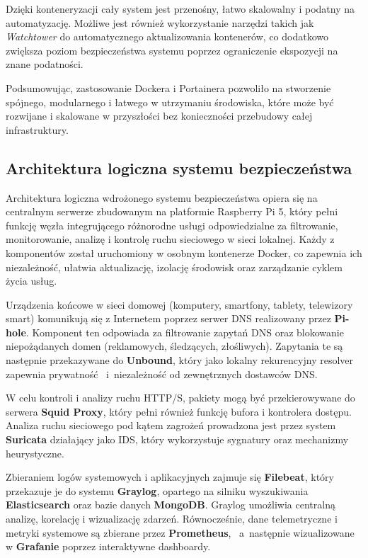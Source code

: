 \documentclass[
    left=2.5cm,         %
    right=2.5cm,        %
    top=2.5cm,          %
    bottom=3cm,         %
    bindingoffset=6mm,  %
    nohyphenation=true %
]{eiti/eiti-thesis} %
\begin{document}
Dzięki konteneryzacji cały system jest przenośny, łatwo skalowalny i podatny na automatyzację. Możliwe jest również wykorzystanie narzędzi takich 
jak \textit{Watchtower} do automatycznego aktualizowania kontenerów, co dodatkowo zwiększa poziom bezpieczeństwa systemu poprzez ograniczenie ekspozycji na znane podatności.

Podsumowując, zastosowanie Dockera i Portainera pozwoliło na stworzenie spójnego, modularnego i łatwego w utrzymaniu środowiska, które może być rozwijane i skalowane w przyszłości bez konieczności przebudowy całej infrastruktury.

\subsection{Architektura logiczna systemu bezpieczeństwa}

Architektura logiczna wdrożonego systemu bezpieczeństwa opiera się na centralnym serwerze zbudowanym na platformie Raspberry Pi 5, który pełni funkcję węzła integrującego różnorodne usługi odpowiedzialne za filtrowanie, monitorowanie, analizę i kontrolę ruchu sieciowego w sieci lokalnej. Każdy z komponentów został uruchomiony w osobnym kontenerze Docker, co zapewnia ich niezależność, ułatwia aktualizację, izolację środowisk oraz zarządzanie cyklem życia usług.

Urządzenia końcowe w sieci domowej (komputery, smartfony, tablety, telewizory smart) komunikują się z Internetem poprzez serwer DNS realizowany przez \textbf{Pi-hole}. Komponent ten odpowiada za filtrowanie zapytań DNS oraz blokowanie niepożądanych domen (reklamowych, śledzących, złośliwych). Zapytania te są następnie przekazywane do \textbf{Unbound}, który jako lokalny rekurencyjny resolver zapewnia prywatność ~i~niezależność od zewnętrznych dostawców DNS.

W celu kontroli i analizy ruchu HTTP/S, pakiety mogą być przekierowywane do serwera \textbf{Squid Proxy}, który pełni również funkcję bufora i kontrolera dostępu. Analiza ruchu sieciowego pod kątem zagrożeń prowadzona jest przez system \textbf{Suricata} działający jako IDS, który wykorzystuje sygnatury oraz mechanizmy heurystyczne.

Zbieraniem logów systemowych i aplikacyjnych zajmuje się \textbf{Filebeat}, który przekazuje je do systemu \textbf{Graylog}, opartego na silniku wyszukiwania \textbf{Elasticsearch} oraz bazie danych \textbf{MongoDB}. Graylog umożliwia centralną analizę, korelację i wizualizację zdarzeń. Równocześnie, dane telemetryczne 
i metryki systemowe są zbierane przez \textbf{Prometheus}, ~a~następnie wizualizowane w \textbf{Grafanie} poprzez interaktywne dashboardy.
\end{document}
